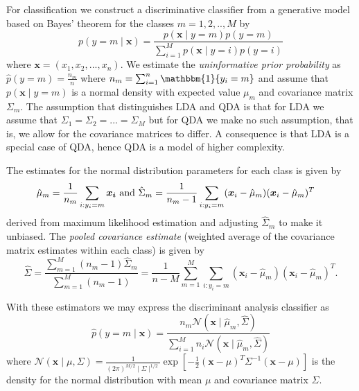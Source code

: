 \documentclass[../../project.tex]{subfiles}
\begin{document}
	For classification we construct a discriminative classifier from a generative model based on Bayes' theorem for the classes $m=1,2,..,M$ by
	\begin{equation}
	p(y=m \mid \boldsymbol{x}) = \frac{ p(\boldsymbol{x} \mid y=m) p(y=m)}
	{\sum_{i=1}^{M} p(\boldsymbol{x} \mid y=i)p(y=i)}
	\end{equation}
	where $\boldsymbol{x}=(x_1,x_2,...,x_n)$. We estimate the \textit{uninformative prior probability} as $\hat{p}(y=m) = \frac{n_m}{n}$ where $n_m = \sum_{i=1}^{n} \mathbbm{1}\{y_i=m\}$ and assume that $p(\boldsymbol{x} \mid y=m)$ is a normal density with expected value $\mu_m$ and covariance matrix $\Sigma_m$. The assumption that distinguishes LDA and QDA is that for LDA we assume that $\Sigma_1=\Sigma_2=...=\Sigma_M$ but for QDA we make no such assumption, that is, we allow for the covariance matrices to differ. A consequence is that LDA is a special case of QDA, hence QDA is a model of higher complexity. 
	
	The estimates for the normal distribution parameters for each class is given by
	\begin{align}
	\hat{\mu}_m &= \frac{1}{n_m} \sum_{i:y_i=m} \boldsymbol{x_i} \vspace{15mm} \text{ and }\vspace{5mm}
	\hat{\Sigma}_m = \frac{1}{n_m-1}\sum_{i:y_i=m} (\boldsymbol{x}_i-\hat{\mu}_m)(\boldsymbol{x}_i-\hat{\mu}_m)^T
	\end{align}
	derived from maximum likelihood estimation and adjusting $\hat{\Sigma}_m$ to make it unbiased. The \textit{pooled covariance estimate} (weighted average of the covariance matrix estimates within each class) is given by
	\begin{equation}
	\hat{\Sigma} = \frac{\sum_{m=1}^{M} (n_m-1)\hat{\Sigma}_m}{\sum_{m=1}^{M} (n_m-1)}=\frac{1}{n-M}\sum_{m=1}^{M}\sum_{i:y_i=m} (\boldsymbol{x}_i-\hat{\mu}_m)(\boldsymbol{x}_i-\hat{\mu}_m)^T.
	\end{equation}
	
	With these estimators we may express the discriminant analysis classifier as
	\begin{equation}
	\hat{p}(y=m \mid \boldsymbol{x}) = \frac{n_m\mathcal{N}(\boldsymbol{x} \mid \hat{\mu}_m, \hat{\Sigma})}{\sum_{i=1}^{M} n_i\mathcal{N}(\boldsymbol{x} \mid \hat{\mu}_m, \hat{\Sigma})}
	\end{equation}
	where $\mathcal{N}(\boldsymbol{x} \mid \mu,\Sigma)=\frac{1}{(2\pi)^{M/2}\mid\Sigma\mid^{1/2}}\exp{[-\frac{1}{2}(\boldsymbol{x}-\mu)^T\Sigma^{-1}(\boldsymbol{x}-\mu)]}$ is the density for the normal distribution with mean $\mu$ and covariance matrix $\Sigma$.
\end{document}
